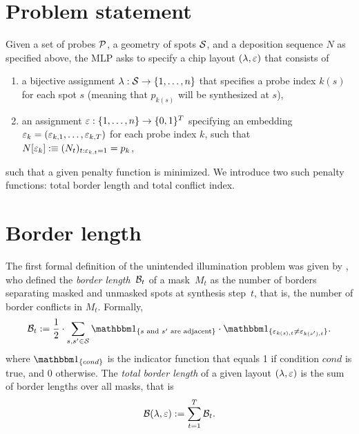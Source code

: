 \section{Problem statement}
\label{sec:mlp_problem}

Given a set of probes ${\mathcal{P}}$, a geometry of spots ${\mathcal{S}}$, and a deposition
sequence $N$ as specified above, the MLP asks to specify a chip layout
$(\lambda,\varepsilon)$ that consists of
\begin{enumerate}
\item a bijective assignment $\lambda: {\mathcal{S}}\to \{1,\dots,n\}$ that specifies a
  probe index $k(s)$ for each spot $s$ (meaning that $p_{k(s)}$ will be
  synthesized at $s$),
\item an assignment $\varepsilon: \{1,\dots,n\}\to \{0,1\}^T$ specifying an embedding
  $\varepsilon_k = (\varepsilon_{k,1},\dots,\varepsilon_{k,T})$ for each probe index $k$, such that
  $N[\varepsilon_k] :\equiv (N_t)_{t: \varepsilon_{k,t}=1} = p_k$,
\end{enumerate}
such that a given penalty function is minimized.  We introduce two such penalty
functions: total border length and total conflict index.


\section{Border length}
\label{sec:mlp_border_length}

The first formal definition of the unintended illumination problem was given by
\citet{Hannenhalli2002}, who defined the \emph{border length}~${\mathcal{B}}_t$ of a
mask~$M_{t}$ as the number of borders separating masked and unmasked spots at
synthesis step~$t$, that is, the number of border conflicts in $M_{t}$.
Formally,
\begin{equation}
\label{eq:border_length}
  \CalB_t := \frac{1}{2} \cdot \sum_{s,s' \in \CalS}
    \Ind{s \text{ and } s' \text{ are adjacent}}
    \cdot \Ind{\eps_{k(s),t} \neq \eps_{k(s'),t}}.
\end{equation}
where $\Ind{cond}$ is the indicator function that equals 1 if condition $cond$
is true, and 0 otherwise. The \emph{total border length} of a given layout
$(\lambda,\varepsilon)$ is the sum of border lengths over all masks, that is
\begin{equation}
\label{eq:total_border_length}
  {\mathcal{B}}(\lambda,\varepsilon) := \sum_{t=1}^{T} {\mathcal{B}}_t.
\end{equation}

